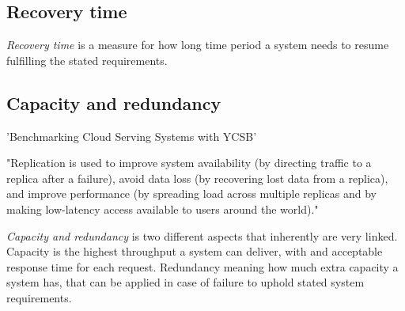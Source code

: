 \subsection{Recovery time}

\textit{Recovery time} is a measure for how long time period a system needs to resume fulfilling the stated requirements.

\subsection{Capacity and redundancy}
'Benchmarking Cloud Serving Systems with YCSB'

"Replication is used to improve system availability (by directing traffic to a replica after a failure), avoid data loss (by recovering lost data from a replica), and improve performance (by spreading load across multiple replicas and by making low-latency access available to users around the world)."

\textit{Capacity and redundancy} is two different aspects that inherently are very linked. Capacity is the highest throughput a system can deliver, with and acceptable response time for each request\cite[p. 136]{nygard2007release}. Redundancy meaning how much extra capacity a system has, that can be applied in case of failure to uphold stated system requirements.

